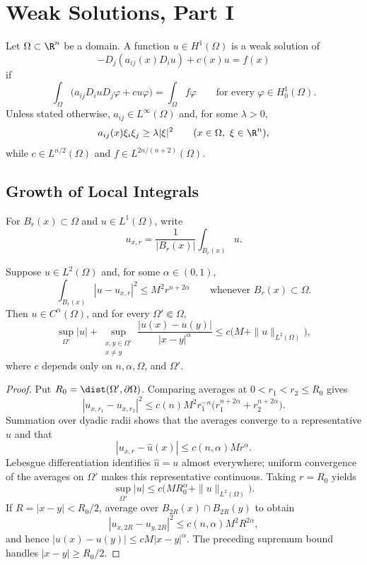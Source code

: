 \chapter{Weak Solutions, Part I}

Let $\Omega\subset\R^n$ be a domain. A function $u\in H^1(\Omega)$ is a weak
solution of
\[
-D_j(a_{ij}(x)D_i u)+c(x)u=f(x)
\]
if
\[
\int_\Omega \bigl(a_{ij}D_i uD_j\varphi+cu\varphi\bigr)
=\int_\Omega f\varphi
\qquad\text{for every }\varphi\in H^1_0(\Omega).
\]
Unless stated otherwise, $a_{ij}\in L^\infty(\Omega)$ and, for some
$\lambda>0$,
\[
a_{ij}(x)\xi_i\xi_j\geq\lambda|\xi|^2
\qquad(x\in\Omega,\ \xi\in\R^n),
\]
while $c\in L^{n/2}(\Omega)$ and
$f\in L^{2n/(n+2)}(\Omega)$.

\section{Growth of Local Integrals}

For $B_r(x)\subset\Omega$ and $u\in L^1(\Omega)$, write
\[
u_{x,r}=\frac{1}{|B_r(x)|}\int_{B_r(x)}u.
\]

\begin{theorem}\label{hanlin:weaksol-part1-campanato}
Suppose $u\in L^2(\Omega)$ and, for some $\alpha\in(0,1)$,
\[
\int_{B_r(x)}|u-u_{x,r}|^2\leq M^2r^{n+2\alpha}
\qquad\text{whenever }B_r(x)\subset\Omega.
\]
Then $u\in C^\alpha(\Omega)$, and for every $\Omega'\Subset\Omega$,
\[
\sup_{\Omega'}|u|+
\sup_{\substack{x,y\in\Omega'\\x\ne y}}
\frac{|u(x)-u(y)|}{|x-y|^\alpha}
\leq c\bigl(M+\|u\|_{L^2(\Omega)}\bigr),
\]
where $c$ depends only on $n,\alpha,\Omega$, and $\Omega'$.
\end{theorem}
\begin{proof}
\sketch Put $R_0=\dist(\Omega',\partial\Omega)$. Comparing averages at
$0<r_1<r_2\leq R_0$ gives
\[
|u_{x,r_1}-u_{x,r_2}|^2
\leq c(n)M^2r_1^{-n}
\bigl(r_1^{n+2\alpha}+r_2^{n+2\alpha}\bigr).
\]
Summation over dyadic radii shows that the averages converge to a representative
$\widehat u$ and that
\[
|u_{x,r}-\widehat u(x)|\leq c(n,\alpha)Mr^\alpha.
\]
Lebesgue differentiation identifies $\widehat u=u$ almost everywhere; uniform
convergence of the averages on $\Omega'$ makes this representative continuous.
Taking $r=R_0$ yields
\[
\sup_{\Omega'}|u|
\leq c\bigl(MR_0^\alpha+\|u\|_{L^2(\Omega)}\bigr).
\]
If $R=|x-y|<R_0/2$, average over
$B_{2R}(x)\cap B_{2R}(y)$ to obtain
\[
|u_{x,2R}-u_{y,2R}|^2\leq c(n,\alpha)M^2R^{2\alpha},
\]
and hence $|u(x)-u(y)|\leq cM|x-y|^\alpha$. The preceding supremum
bound handles $|x-y|\geq R_0/2$.
\end{proof}

